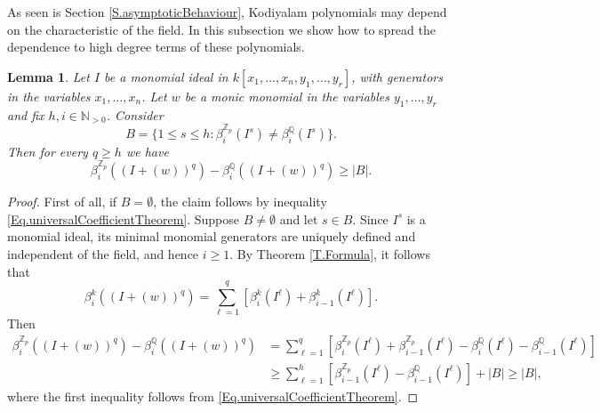 \documentclass[11pt,oneside]{amsart}
\theoremstyle{plain}
\newtheorem{lemma}[theorem]{Lemma}
\theoremstyle{definition}
\begin{document}
As seen is Section \ref{S.asymptoticBehaviour}, Kodiyalam polynomials may depend on the characteristic of the field. In this subsection we show how to spread the dependence to high degree terms of these polynomials.

\begin{lemma}\label{L.spreadingDependenceToPowers}
Let $I$ be a monomial ideal in $k[x_1,\dots,x_n,y_1,\dots,y_r]$, with generators in the variables $x_1,\dots,x_n$. Let $w$ be a monic monomial in the variables $y_1,\dots,y_r$ and fix $h,i \in \mathbb{N}_{>0}$. Consider 
\[
B=\{1 \leq s \leq h: \beta_i^{\mathbb{Z}_p}(I^s) \neq \beta_i^\mathbb{Q}(I^s)\}.
\]
Then for every $q \geq h$ we have
\[
\beta_i^{\mathbb{Z}_p}((I+(w))^q) - \beta_i^\mathbb{Q}((I+(w))^q) \geq |B|. %
\]
\end{lemma}

\begin{proof}
First of all, if $B = \emptyset$, the claim follows by inequality \eqref{Eq.universalCoefficientTheorem}.
Suppose $B \neq \emptyset$ and let $s \in B$. Since $I^{s}$ is a monomial ideal, its minimal monomial generators are uniquely defined and independent of the field, and hence $i \geq 1$. By Theorem \ref{T.Formula}, it follows that 
\[
\beta_i^{k}((I+(w))^q)=\sum_{\ell=1}^q \left[\beta_i^k(I^{\ell})+\beta_{i-1}^k(I^{\ell}) \right].
\] 
Then 
\begin{align*}
\beta_i^{\mathbb{Z}_p}((I+(w))^q) - \beta_i^\mathbb{Q}((I+(w))^q) &= \sum_{\ell=1}^q \left[\beta_i^{\mathbb{Z}_p}(I^{\ell})+\beta_{i-1}^{\mathbb{Z}_p}(I^{\ell})-\beta_i^{\mathbb{Q}}(I^{\ell})-\beta_{i-1}^{\mathbb{Q}}(I^{\ell})\right]\\
& \geq \sum_{\ell=1}^h \left[\beta_{i-1}^{\mathbb{Z}_p}(I^{\ell})-\beta_{i-1}^{\mathbb{Q}}(I^{\ell})\right]+|B| \geq |B|,
\end{align*}
where the first inequality follows from \eqref{Eq.universalCoefficientTheorem}. 
\end{proof}

\end{document}
